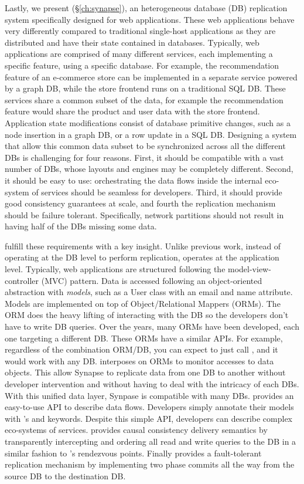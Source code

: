 Lastly, we present \synapse (\S\ref{ch:synapse}), an heterogeneous database (DB)
replication system specifically designed for web applications. These web
applications behave very differently compared to traditional single-host
applications as they are distributed and have their state contained in
databases. Typically, web applications are comprised of many different
services, each implementing a specific feature, using a specific database.
For example, the recommendation feature of an e-commerce store can be
implemented in a separate service powered by a graph DB, while the store
frontend runs on a traditional SQL DB. These services share a common subset
of the data, for example the recommendation feature would share the product
and user data with the store frontend.
Application state modifications consist of database primitive changes, such as a
node insertion in a graph DB, or a row update in a SQL DB. 
Designing a system that allow this common data subset to be synchronized across
all the different DBs is challenging for four reasons. First, it should be
compatible with a vast number of DBs, whose layouts and engines may be
completely different. Second, it should be easy to use: orchestrating the data
flows inside the internal eco-system of services should be seamless for developers.
Third, it should provide good consistency guarantees at scale, and fourth
the replication mechanism should be failure tolerant. Specifically, network partitions
should not result in having half of the DBs missing some data.

\synapse fulfill these requirements with a key insight. Unlike previous work,
instead of operating at the DB level to perform replication, \synapse operates
at the application level. Typically, web applications are structured following
the model-view-controller (MVC) pattern. Data is accessed following an object-oriented
abstraction with {\em models}, such as a User class with an email and name
attribute.  Models are implemented on top of Object/Relational Mappers (ORMs).
The ORM does the heavy lifting of interacting with the DB so the developers
don't have to write DB queries. Over the years, many ORMs have been developed,
each one targeting a different DB. These ORMs have a similar APIs.  For example,
regardless of the combination ORM/DB, you can expect to just call
, and it would work with any DB. \synapse interposes on ORMs
to monitor accesses to data objects. This allow Synapse to replicate data from
one DB to another without developer intervention and without having to deal with
the intricacy of each DBs. With this unified data layer, Synpase is compatible
with many DBs.
\synapse provides an easy-to-use API to describe data flows. Developers simply
annotate their models with \synapse's  and 
keywords.  Despite this simple API, developers can describe complex eco-systems
of services. \synapse provides causal consistency delivery semantics by
transparently intercepting and ordering all read and write queries to the DB in
a similar fashion to \scribe's rendezvous points. Finally \synapse provides
a fault-tolerant replication mechanism by implementing two phase commits all
the way from the source DB to the destination DB.


